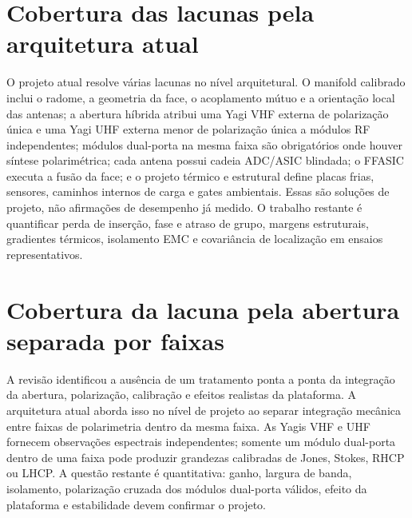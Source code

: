\section{Cobertura das lacunas pela arquitetura atual}
O projeto atual resolve várias lacunas no nível arquitetural. O manifold calibrado inclui o radome, a geometria da face, o acoplamento mútuo e a orientação local das antenas; a abertura híbrida atribui uma Yagi VHF externa de polarização única e uma Yagi UHF externa menor de polarização única a módulos RF independentes; módulos dual-porta na mesma faixa são obrigatórios onde houver síntese polarimétrica; cada antena possui cadeia ADC/ASIC blindada; o FFASIC executa a fusão da face; e o projeto térmico e estrutural define placas frias, sensores, caminhos internos de carga e gates ambientais. Essas são soluções de projeto, não afirmações de desempenho já medido. O trabalho restante é quantificar perda de inserção, fase e atraso de grupo, margens estruturais, gradientes térmicos, isolamento EMC e covariância de localização em ensaios representativos.

\section{Cobertura da lacuna pela abertura separada por faixas}
A revisão identificou a ausência de um tratamento ponta a ponta da integração da abertura, polarização, calibração e efeitos realistas da plataforma. A arquitetura atual aborda isso no nível de projeto ao separar integração mecânica entre faixas de polarimetria dentro da mesma faixa. As Yagis VHF e UHF fornecem observações espectrais independentes; somente um módulo dual-porta dentro de uma faixa pode produzir grandezas calibradas de Jones, Stokes, RHCP ou LHCP. A questão restante é quantitativa: ganho, largura de banda, isolamento, polarização cruzada dos módulos dual-porta válidos, efeito da plataforma e estabilidade devem confirmar o projeto.
